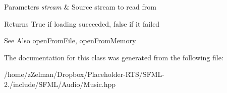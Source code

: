 \begin{DoxyParams}{Parameters}
{\em stream} & Source stream to read from\\
\hline
\end{DoxyParams}
\begin{DoxyReturn}{Returns}
True if loading succeeded, false if it failed
\end{DoxyReturn}
\begin{DoxySeeAlso}{See Also}
\hyperlink{classsf_1_1Music_a3edc66e5f5b3f11e84b90eaec9c7d7c0}{open\-From\-File}, \hyperlink{classsf_1_1Music_ae93b21bcf28ff0b5fec458039111386e}{open\-From\-Memory} 
\end{DoxySeeAlso}


The documentation for this class was generated from the following file\-:\begin{DoxyCompactItemize}
\item 
/home/z\-Zelman/\-Dropbox/\-Placeholder-\/\-R\-T\-S/\-S\-F\-M\-L-\/2./include/\-S\-F\-M\-L/\-Audio/Music.\-hpp\end{DoxyCompactItemize}
